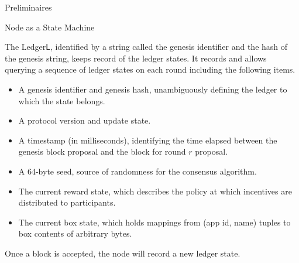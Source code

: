 \documentclass[10pt,a4paper]{article}
\begin{document}
\begin{section}{Preliminaires}
\begin{subsection}{Node as a State Machine}




The Ledger$\mathsf{L}$, identified by a string called the genesis identifier and 
the hash of the genesis string, keeps record of the ledger states.
It records and allows querying a sequence of ledger states on each round
including the following items.
\begin{itemize}
    \item A genesis identifier and genesis hash, unambiguously defining the ledger 
        to which the state belongs.
    \item A protocol version and update state.
    \item A timestamp (in milliseconds), identifying the time elapsed between the genesis block proposal 
        and the block for round $r$ proposal.
    \item A 64-byte seed, source of randomness for the consensus algorithm.
    \item The current reward state, which describes the policy at which incentives
        are distributed to participants.
    \item The current box state, which holds mappings from (app id, name) tuples
        to box contents of arbitrary bytes.
\end{itemize}
Once a block is accepted, the node will record a new ledger state.



\end{subsection}
\end{section}
\end{document}
